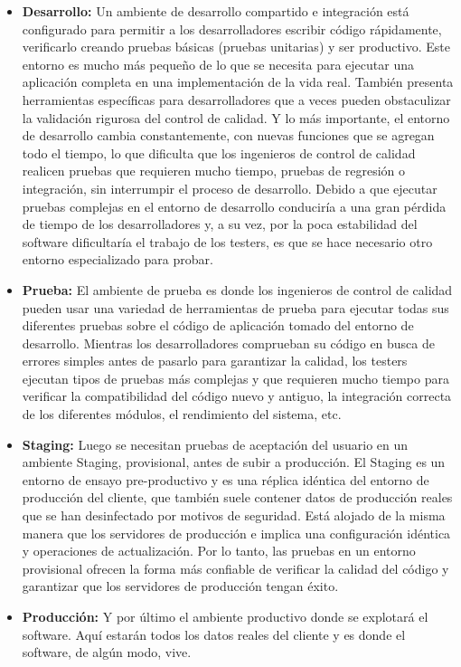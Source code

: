 \begin{itemize}

\item \textbf{Desarrollo:} Un ambiente de desarrollo compartido e integración está configurado para permitir a los desarrolladores escribir código rápidamente, verificarlo creando pruebas básicas (pruebas unitarias) y ser productivo. Este entorno es mucho más pequeño de lo que se necesita para ejecutar una aplicación completa en una implementación de la vida real. También presenta herramientas específicas para desarrolladores que a veces pueden obstaculizar la validación rigurosa del control de calidad. Y lo más importante, el entorno de desarrollo cambia constantemente, con nuevas funciones que se agregan todo el tiempo, lo que dificulta que los ingenieros de control de calidad realicen pruebas que requieren mucho tiempo, pruebas de regresión o integración, sin interrumpir el proceso de desarrollo. Debido a que ejecutar pruebas complejas en el entorno de desarrollo conduciría a una gran pérdida de tiempo de los desarrolladores y, a su vez, por la poca estabilidad del software dificultaría el trabajo de los testers, es que se hace necesario otro entorno especializado para probar.

\item \textbf{Prueba:} El ambiente de prueba es donde los ingenieros de control de calidad pueden usar una variedad de herramientas de prueba para ejecutar todas sus diferentes pruebas sobre el código de aplicación tomado del entorno de desarrollo. Mientras los desarrolladores comprueban su código en busca de errores simples antes de pasarlo para garantizar la calidad, los testers ejecutan tipos de pruebas más complejas y que requieren mucho tiempo para verificar la compatibilidad del código nuevo y antiguo, la integración correcta de los diferentes módulos, el rendimiento del sistema, etc. 

\item \textbf{Staging:} Luego se necesitan pruebas de aceptación del usuario en un ambiente Staging, provisional, antes de subir a producción. El Staging es un entorno de ensayo pre-productivo y es una réplica idéntica del entorno de producción del cliente, que también suele contener datos de producción reales que se han desinfectado por motivos de seguridad. Está alojado de la misma manera que los servidores de producción e implica una configuración idéntica y operaciones de actualización. Por lo tanto, las pruebas en un entorno provisional ofrecen la forma más confiable de verificar la calidad del código y garantizar que los servidores de producción tengan éxito.

\item \textbf{Producción:} Y por último el ambiente productivo donde se explotará el software. Aquí estarán todos los datos reales del cliente y es donde el software, de algún modo, vive.

\end{itemize}

